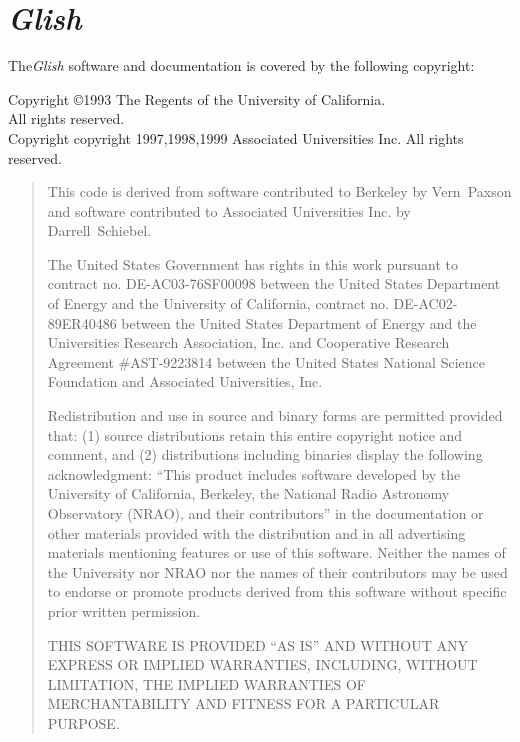 \section{{\em Glish}}
The{\em  Glish} software and documentation is covered by the following copyright:

\begin{center}
Copyright \copyright 1993 The Regents of the University of California.\\
All rights reserved.\\
Copyright copyright 1997,1998,1999 Associated Universities Inc.
All rights reserved.
\end{center}

\begin{sloppy}
\begin{quotation}
This code is derived from software contributed to Berkeley by
\mbox{Vern~Paxson} and software contributed to Associated Universities
Inc. by \mbox{Darrell~Schiebel}.

The United States Government has rights in this work pursuant
to contract no. DE-AC03-76SF00098 between the United States
Department of Energy and the University of California, contract
no. DE-AC02-89ER40486 between the United States Department of Energy
and the Universities Research Association, Inc. and Cooperative
Research Agreement \#AST-9223814 between the United States National
Science Foundation and Associated Universities, Inc.

Redistribution and use in source and binary forms are permitted
provided that: (1) source distributions retain this entire
copyright notice and comment, and (2) distributions including
binaries display the following acknowledgment:  ``This product
includes software developed by the University of California,
Berkeley, the National Radio Astronomy Observatory (NRAO), and
their contributors'' in the documentation or other materials
provided with the distribution and in all advertising materials
mentioning features or use of this software.  Neither the names of
the University nor NRAO nor the names of their contributors may be
used to endorse or promote products derived from this software
without specific prior written permission.

THIS SOFTWARE IS PROVIDED ``AS IS'' AND WITHOUT ANY EXPRESS OR
IMPLIED WARRANTIES, INCLUDING, WITHOUT LIMITATION, THE IMPLIED
WARRANTIES OF MERCHANTABILITY AND FITNESS FOR A PARTICULAR
PURPOSE.
\end{quotation}
\end{sloppy}

